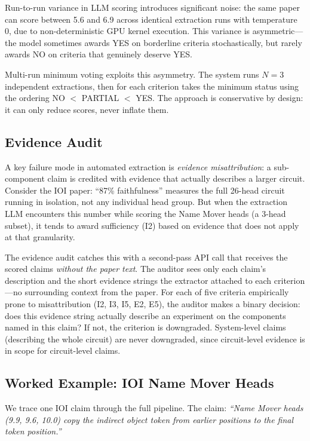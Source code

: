 \documentclass[10pt]{article}
\begin{document}
Run-to-run variance in LLM scoring introduces significant noise: the same paper can score between 5.6 and 6.9 across identical extraction runs with temperature 0, due to non-deterministic GPU kernel execution. This variance is asymmetric---the model sometimes awards YES on borderline criteria stochastically, but rarely awards NO on criteria that genuinely deserve YES.

Multi-run minimum voting exploits this asymmetry. The system runs $N=3$ independent extractions, then for each criterion takes the minimum status using the ordering NO $<$ PARTIAL $<$ YES. The approach is conservative by design: it can only reduce scores, never inflate them.

\subsection{Evidence Audit}

A key failure mode in automated extraction is \emph{evidence misattribution}: a sub-component claim is credited with evidence that actually describes a larger circuit. Consider the IOI paper: ``87\% faithfulness'' measures the full 26-head circuit running in isolation, not any individual head group. But when the extraction LLM encounters this number while scoring the Name Mover heads (a 3-head subset), it tends to award sufficiency (I2) based on evidence that does not apply at that granularity.

The evidence audit catches this with a second-pass API call that receives the scored claims \emph{without the paper text}. The auditor sees only each claim's description and the short evidence strings the extractor attached to each criterion---no surrounding context from the paper. For each of five criteria empirically prone to misattribution (I2, I3, I5, E2, E5), the auditor makes a binary decision: does this evidence string actually describe an experiment on the components named in this claim? If not, the criterion is downgraded. System-level claims (describing the whole circuit) are never downgraded, since circuit-level evidence is in scope for circuit-level claims.

\subsection{Worked Example: IOI Name Mover Heads}

We trace one IOI claim through the full pipeline. The claim: \emph{``Name Mover heads (9.9, 9.6, 10.0) copy the indirect object token from earlier positions to the final token position.''}
\end{document}
